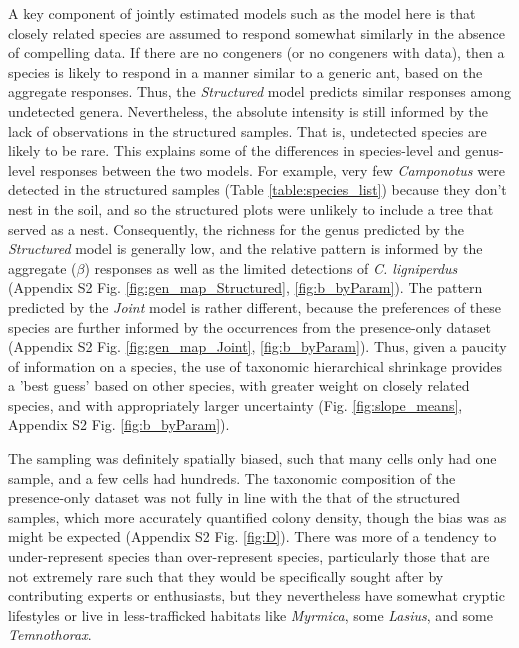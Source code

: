 \documentclass[preprint,review,times,12pt,3p]{elsarticle}
\begin{document}
A key component of jointly estimated models such as the model here is that closely related species are assumed to respond somewhat similarly in the absence of compelling data. If there are no congeners (or no congeners with data), then a species is likely to respond in a manner similar to a generic ant, based on the aggregate responses. Thus, the \emph{Structured} model predicts similar responses among undetected genera. Nevertheless, the absolute intensity is still informed by the lack of observations in the structured samples. That is, undetected species are likely to be rare. This explains some of the differences in species-level and genus-level responses between the two models. For example, very few \emph{Camponotus} were detected in the structured samples (Table \ref{table:species_list}) because they don't nest in the soil, and so the structured plots were unlikely to include a tree that served as a nest. Consequently, the richness for the genus predicted by the \emph{Structured} model is generally low, and the relative pattern is informed by the aggregate ($\beta$) responses as well as the limited detections of \emph{C. ligniperdus} (Appendix S2 Fig. \ref{fig:gen_map_Structured}, \ref{fig:b_byParam}). The pattern predicted by the \emph{Joint} model is rather different, because the preferences of these species are further informed by the occurrences from the presence-only dataset (Appendix S2 Fig. \ref{fig:gen_map_Joint}, \ref{fig:b_byParam}). Thus, given a paucity of information on a species, the use of taxonomic hierarchical shrinkage provides a 'best guess' based on other species, with greater weight on closely related species, and with appropriately larger uncertainty (Fig. \ref{fig:slope_means}, Appendix S2 Fig. \ref{fig:b_byParam}).

The sampling was definitely spatially biased, such that many cells only had one sample, and a few cells had hundreds. The taxonomic composition of the presence-only dataset was not fully in line with the that of the structured samples, which more accurately quantified colony density, though the bias was as might be expected (Appendix S2 Fig. \ref{fig:D}). There was more of a tendency to under-represent species than over-represent species, particularly those that are not extremely rare such that they would be specifically sought after by contributing experts or enthusiasts, but they nevertheless have somewhat cryptic lifestyles or live in less-trafficked habitats like \emph{Myrmica}, some \emph{Lasius}, and some \emph{Temnothorax}. 
\end{document}
